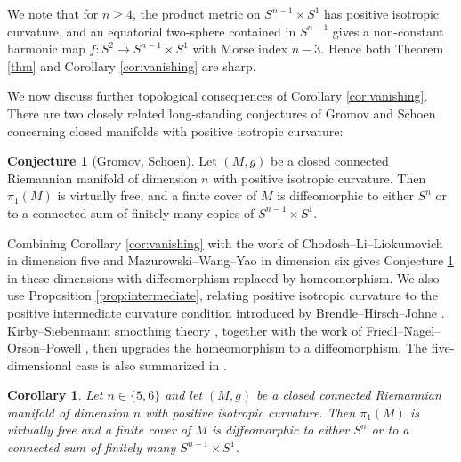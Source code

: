 \documentclass[11pt]{amsart}
\newtheorem{corollary}[theorem]{Corollary}
\theoremstyle{definition}
\newtheorem{conjecture}[theorem]{Conjecture}
\begin{document}
We note that for $n\geq 4$, the product metric on $S^{n-1}\times S^1$ has positive isotropic curvature, and an equatorial two-sphere contained in $S^{n-1}$ gives a non-constant harmonic map $f:S^2\to S^{n-1}\times S^1$ with Morse index $n-3$. Hence both Theorem \ref{thm} and Corollary \ref{cor:vanishing} are sharp.

We now discuss further topological consequences of Corollary \ref{cor:vanishing}. There are two closely related long-standing conjectures of Gromov and Schoen concerning closed manifolds with positive isotropic curvature:
\begin{conjecture}[Gromov, Schoen]\label{conj:GS}
Let $(M,g)$ be a closed connected Riemannian manifold of dimension $n$ with positive isotropic curvature. Then $\pi_1(M)$ is virtually free, and a finite cover of $M$ is diffeomorphic to either $S^n$ or to a connected sum of finitely many copies of $S^{n-1}\times S^1$.
\end{conjecture}
Combining Corollary \ref{cor:vanishing} with the work of Chodosh--Li--Liokumovich \cite{CLL2023} in dimension five and Mazurowski--Wang--Yao \cite{MWY2026} in dimension six gives Conjecture \ref{conj:GS} in these dimensions with diffeomorphism replaced by homeomorphism. We also use Proposition \ref{prop:intermediate}, relating positive isotropic curvature to the positive intermediate curvature condition introduced by Brendle--Hirsch--Johne \cite{BHJ2024}. Kirby--Siebenmann smoothing theory \cite{KS1977}, together with the work of Friedl--Nagel--Orson--Powell \cite{FNOP2025}, then upgrades the homeomorphism to a diffeomorphism. The five-dimensional case is also summarized in \cite[Theorem~2.1(ii)]{DP2026}.
\begin{corollary}
    Let $n\in \{5,6\}$ and let $(M,g)$ be a closed connected Riemannian manifold of dimension $n$ with positive isotropic curvature. Then $\pi_1(M)$ is virtually free and a finite cover of $M$ is diffeomorphic to either $S^n$ or to a
connected sum of finitely many $S^{n-1}\times S^1$.
\end{corollary}
\end{document}
